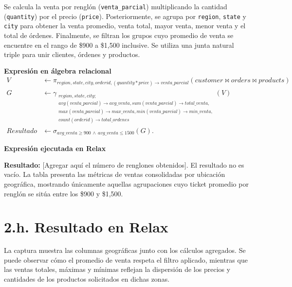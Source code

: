 Se calcula la venta por renglón (\texttt{venta\_parcial}) multiplicando la cantidad (\texttt{quantity}) por el precio (\texttt{price}). Posteriormente, se agrupa por \texttt{region}, \texttt{state} y \texttt{city} para obtener la venta promedio, venta total, mayor venta, menor venta y el total de órdenes. Finalmente, se filtran los grupos cuyo promedio de venta se encuentre en el rango de \$900 a \$1,500 inclusive. Se utiliza una junta natural triple para unir clientes, órdenes y productos.

\textbf{Expresión en álgebra relacional}
\begin{align*}
V &\leftarrow \pi_{region, state, city, orderid, (quantity * price) \to venta\_parcial}(customer \bowtie orders \bowtie products)\\
G &\leftarrow \gamma_{\substack{region, state, city;\\ avg(venta\_parcial) \to avg\_venta, sum(venta\_parcial) \to total\_venta,\\ max(venta\_parcial) \to max\_venta, min(venta\_parcial) \to min\_venta,\\ count(orderid) \to total\_ordenes}}(V)\\
Resultado &\leftarrow \sigma_{avg\_venta \geq 900 \,\land\, avg\_venta \leq 1500}(G).
\end{align*}

\textbf{Expresión ejecutada en Relax}


\textbf{Resultado:} [Agregar aquí el número de renglones obtenidos]. El resultado no es vacío. La tabla presenta las métricas de ventas consolidadas por ubicación geográfica, mostrando únicamente aquellas agrupaciones cuyo ticket promedio por renglón se sitúa entre los \$900 y \$1,500.
\newpage
\section*{2.h. Resultado en Relax}
La captura muestra las columnas geográficas junto con los cálculos agregados. Se puede observar cómo el promedio de venta respeta el filtro aplicado, mientras que las ventas totales, máximas y mínimas reflejan la dispersión de los precios y cantidades de los productos solicitados en dichas zonas.
